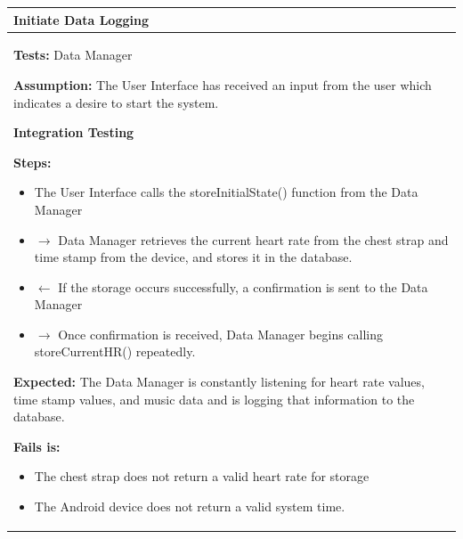 \documentclass[letterpaper,english, 12pt]{scrreprt}
\begin{document}
\begin{center}
         \begin{tabular}{|C{15cm}|}
                 \hline
                        \textbf{Initiate Data Logging} \\
                \hline
                        \begin{flushleft}
                                \textbf{Tests: } Data Manager
                        \end{flushleft}
                        \begin{flushleft}
                                \textbf{Assumption: } The User Interface has received an input from the user which indicates a desire to start the system.
                        \end{flushleft}
			\begin{center}
				\textbf{Integration Testing}
			\end{center}
                        \begin{flushleft}
                                \textbf{Steps: }
                        \end{flushleft}
                                \begin{itemize}
                                        \item The User Interface calls the storeInitialState() function from the Data Manager
                                        \item $\rightarrow$ Data Manager retrieves the current heart rate from the chest strap and time stamp from the device, and stores it in the database.
                                        \item $\leftarrow$ If the storage occurs successfully, a confirmation is sent to the Data Manager
                                        \item $\rightarrow$ Once confirmation is received, Data Manager begins calling storeCurrentHR() repeatedly.
                                \end{itemize}
                        \begin{flushleft}
                                \textbf{Expected: } The Data Manager is constantly listening for heart rate values, time stamp values, and music data and is logging that information to the database.
                        \end{flushleft}
                        \begin{flushleft}
                                \textbf{Fails is: }
                        \end{flushleft}
                                \begin{itemize}
                                        \item The chest strap does not return a valid heart rate for storage
                                        \item The Android device does not return a valid system time.
                                \end{itemize}\\
                \hline
        \end{tabular}
\end{center}
\end{document}
